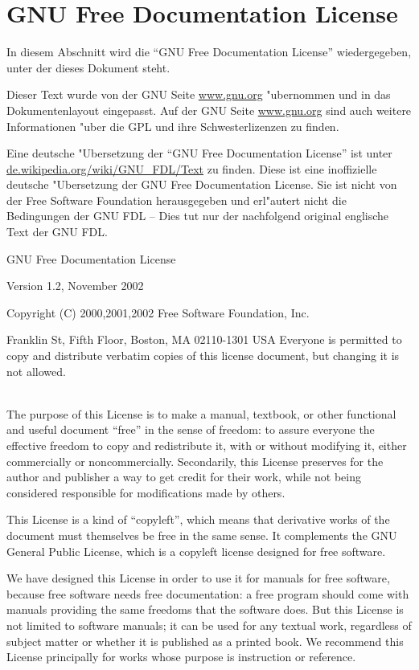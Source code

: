 
\section{GNU Free Documentation License}

In diesem Abschnitt wird die "`GNU Free Documentation License"'  wiedergegeben, unter der dieses Dokument steht.

Dieser Text wurde von der GNU Seite \url{www.gnu.org} "ubernommen und in das Dokumentenlayout eingepasst. Auf der GNU Seite \url{www.gnu.org} sind auch weitere Informationen "uber die GPL und ihre Schwesterlizenzen zu finden.

\noindent
Eine deutsche "Ubersetzung der "`GNU Free Documentation License"' ist unter \url{de.wikipedia.org/wiki/GNU_FDL/Text} zu finden. Diese ist eine inoffizielle deutsche "Ubersetzung der GNU Free Documentation License. Sie ist nicht von der Free Software Foundation herausgegeben und erl"autert nicht die Bedingungen der GNU FDL -- Dies tut nur der nachfolgend original englische Text der GNU FDL.

\bigskip\noindent
GNU Free Documentation License

\noindent		  
Version 1.2, November 2002

\noindent	
Copyright (C) 2000,2001,2002  Free Software Foundation, Inc.
 
 Franklin St, Fifth Floor, Boston, MA  02110-1301  USA Everyone is permitted to copy and distribute verbatim copies of this license document, but changing it is not allowed.

\bigskip{}\\

\noindent
The purpose of this License is to make a manual, textbook, or other functional and useful document "`free"' in the sense of freedom: to assure everyone the effective freedom to copy and redistribute it,
with or without modifying it, either commercially or noncommercially. Secondarily, this License preserves for the author and publisher a way to get credit for their work, while not being considered responsible for modifications made by others.

This License is a kind of "`copyleft"', which means that derivative works of the document must themselves be free in the same sense. It complements the GNU General Public License, which is a copyleft license designed for free software.

We have designed this License in order to use it for manuals for free software, because free software needs free documentation: a free program should come with manuals providing the same freedoms that the software does.  But this License is not limited to software manuals; it can be used for any textual work, regardless of subject matter or whether it is published as a printed book. We recommend this License principally for works whose purpose is instruction or reference.


